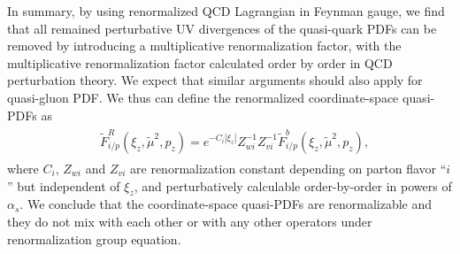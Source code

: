 In summary, by using renormalized QCD Lagrangian in Feynman gauge, we find that all remained perturbative UV divergences of the quasi-quark PDFs can be removed by introducing a multiplicative renormalization factor, with the multiplicative renormalization factor calculated order by order in QCD perturbation theory.  We expect that similar arguments should also apply for quasi-gluon PDF.  We thus can define the renormalized coordinate-space quasi-PDFs as
\begin{align}\label{eq:renor}
\begin{split}
&\tilde{F}^{R}_{i/p}(\xi_z,\tilde{\mu}^2,p_z)=e^{-C_i |\xi_z|}Z_{wi}^{-1}Z_{vi}^{-1}\tilde{F}^{b}_{i/p}(\xi_z,\tilde{\mu}^2,p_z),
\end{split}
\end{align}
where $C_i$, $Z_{wi}$ and $Z_{vi}$ are renormalization constant depending on parton flavor ``$i$'' but independent of $\xi_z$, and perturbatively calculable order-by-order in powers of $\alpha_s$.   We conclude that the coordinate-space quasi-PDFs are renormalizable and they do not mix with each other or with any other operators under renormalization group equation.
